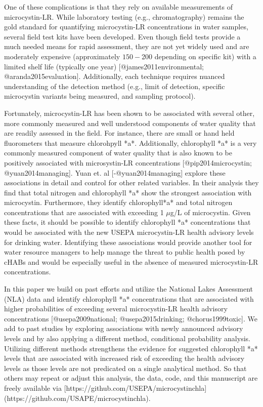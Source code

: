 One of these complications is that they rely on available measurements of microcystin-LR.  While laboratory testing (e.g., chromatography) remains the gold standard for quantifying microcystin-LR concentrations in water samples, several field test kits have been developed.  Even though field tests provide a much needed means for rapid assessment, they are not yet widely used and are moderately expensive (approximately $150-$200 depending on specific kit) with a limited shelf life (typically one year) [@james2011environmental; @aranda2015evaluation].  Additionally, each technique requires nuanced understanding of the detection method (e.g., limit of detection, specific microcystin variants being measured, and sampling protocol).  

Fortunately, microcystin-LR has been shown to be associated with several other, more commonly measured and well understood components of water quality that are readily assessed in the field.  For instance, there are small or hand held fluorometers that measure chlorohpyll *a*.  Additionally, chlorophyll *a* is a very commonly measured component of water quality that is also known to be positively associated with microsystin-LR concentrations [@pip2014microcystin; @yuan2014managing].  Yuan et. al [-@yuan2014managing] explore these associations in detail and control for other related variables.  In their analysis they find that total nitrogen and chlorophyll *a* show the strongest association with microcystin. Furthermore, they identify chlorophyll*a* and total nitrogen concentrations that are associated with exceeding 1 $\mu$g/L of microcystin.   Given these facts, it should be possible to identify chlorophyll *a* concentrations that would be associated with the new USEPA microcystin-LR health advisory levels for drinking water.  Identifying these associations would provide another tool for water resource managers to help manage the threat to public health posed by cHABs and would be especially useful in the absence of measured microcystin-LR concentrations.  

In this paper we build on past efforts and utilize the National Lakes Assessment (NLA) data and identify chlorophyll *a* concentrations that are associated with higher probabilities of exceeding several microcystin-LR health advisory concentrations [@usepa2009national; @usepa2015drinking; @chorus1999toxic].  We add to past studies by exploring associations with newly announced advisory levels and by also applying a different method, conditional probability analysis.  Utilizing different methods strengthens the evidence for suggested chlorophyll *a* levels that are associated with increased risk of exceeding the health advisory levels as those levels are not predicated on a single analytical method.  So that others may repeat or adjust this analysis, the data, code, and this manuscript are freely available via [https://github.com/USEPA/microcystinchla](https://github.com/USAPE/microcystinchla).

